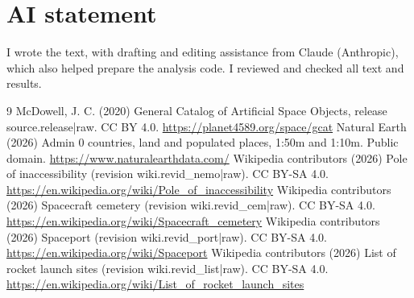 \documentclass[11pt,a4paper]{article}
\begin{document}
\section*{AI statement}
I wrote the text, with drafting and editing assistance from Claude (Anthropic), which also helped prepare the analysis code. I reviewed and checked all text and results.

\begin{thebibliography}{9}
 McDowell, J. C. (2020) General Catalog of Artificial Space Objects, release {{source.release|raw}}. CC BY 4.0. \url{https://planet4589.org/space/gcat}
 Natural Earth (2026) Admin 0 countries, land and populated places, 1:50m and 1:10m. Public domain. \url{https://www.naturalearthdata.com/}
 Wikipedia contributors (2026) Pole of inaccessibility (revision {{wiki.revid_nemo|raw}}). CC BY-SA 4.0. \url{https://en.wikipedia.org/wiki/Pole_of_inaccessibility}
 Wikipedia contributors (2026) Spacecraft cemetery (revision {{wiki.revid_cem|raw}}). CC BY-SA 4.0. \url{https://en.wikipedia.org/wiki/Spacecraft_cemetery}
 Wikipedia contributors (2026) Spaceport (revision {{wiki.revid_port|raw}}). CC BY-SA 4.0. \url{https://en.wikipedia.org/wiki/Spaceport}
 Wikipedia contributors (2026) List of rocket launch sites (revision {{wiki.revid_list|raw}}). CC BY-SA 4.0. \url{https://en.wikipedia.org/wiki/List_of_rocket_launch_sites}
\end{thebibliography}
\end{document}

